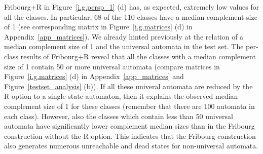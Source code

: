 Fribourg+R in Figure~\ref{i.g.persp_1} (d) has, as expected, extremely low values for all the classes. In particular, 68 of the 110 classes have a median complement size of 1 (see corresponding matrix in Figure~\ref{i.g.matrices} (d) in Appendix~\ref{app_matrices}). We already hinted previously at the relation of a median complement size of 1 and the universal automata in the \goal{} test set. The per-class results of Fribourg+R reveal that all the classes with a median complement size of 1 contain 50 or more universal automata (compare matrices in Figure~\ref{i.g.matrices} (d) in Appendix~\ref{app_matrices} and Figure~\ref{testset_analysis} (b)). If all these univeral automata are reduced by the R option to a single-state automaton, then it explains the observed median complement size of 1 for these classes (remember that there are 100 automata in each class). However, also the classes which contain less than 50 universal automata have significantly lower complement median sizes than in the Fribourg construction without the R option. This indicates that the Fribourg construction also  generates numerous unreachable and dead states for non-universal automata. 


